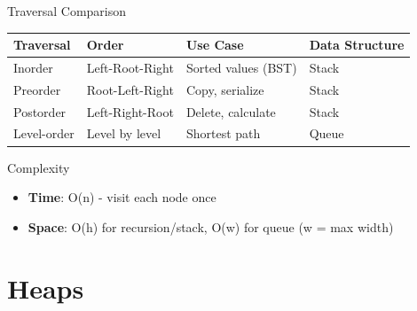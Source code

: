 \documentclass[aspectratio=169,xcolor=dvipsnames]{beamer}
\begin{document}
\begin{frame}{Traversal Comparison}
  \begin{table}
    \centering
    \begin{tabular}{l|l|l|l}
      \toprule
      \textbf{Traversal} & \textbf{Order} & \textbf{Use Case} & \textbf{Data Structure} \\
      \midrule
      Inorder & Left-Root-Right & Sorted values (BST) & Stack \\
      Preorder & Root-Left-Right & Copy, serialize & Stack \\
      Postorder & Left-Right-Root & Delete, calculate & Stack \\
      Level-order & Level by level & Shortest path & Queue \\
      \bottomrule
    \end{tabular}
  \end{table}

  \vspace{0.5cm}

  \begin{block}{Complexity}
    \begin{itemize}
      \item \textbf{Time}: O(n) - visit each node once
      \item \textbf{Space}: O(h) for recursion/stack, O(w) for queue (w = max width)
    \end{itemize}
  \end{block}
\end{frame}

\section{Heaps}
\end{document}
